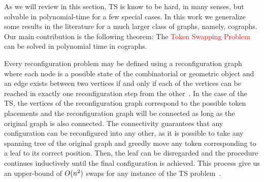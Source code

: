 \documentclass[msc,english,table,xcdraw]{ppgccufmg}
\begin{document}
As we will review in this section, TS is know to be hard, in many senses, but solvable in polynomial-time for a few special cases. 
In this work we generalize some results in the literature for a much larger class of graphs, namely, cographs. 
Our main contribution is the following theorem: The \textcolor{red}{Token Swapping Problem} can be solved in polynomial time in cographs.




Every reconfiguration problem may be defined using a reconfiguration 
graph where each node is a possible state of the combinatorial
or geometric object and an edge exists between two vertices if and only if each of the vertices can be reached in exactly one reconfiguration step from the other~\cite{Naomi:2018}.
In the case of the TS, the vertices of the reconfiguration graph correspond to the possible token placements and the reconfiguration graph will be connected as long as the original graph is also connected.
The connectivity guarantees that any configuration can be reconfigured into any other, as it is possible to take any spanning tree of the original graph and greedly
move any token corresponding to a leaf to its correct position. 
Then, the leaf can be disregarded and the procedure continues inductively until the final configuration is achieved.
This process give us an upper-bound of $O(n^{2})$ swaps for any instance of the TS problem~\cite{Yamanaka:2015}.

\end{document}
